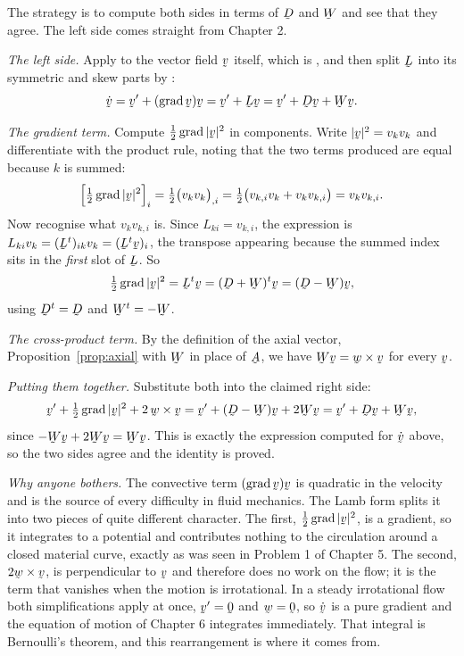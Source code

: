 \begin{solution}
The strategy is to compute both sides in terms of $\bD$ and $\bW$ and see
that they agree. The left side comes straight from Chapter 2.

\emph{The left side.} Apply  to the vector field $\bv$ itself,
which is , and then split $\bL$ into its symmetric and skew
parts by :
\[
   \dot\bv=\bv'+(\grad\bv)\bv=\bv'+\bL\bv=\bv'+\bD\bv+\bW\bv .
\]

\emph{The gradient term.} Compute $\tfrac12\grad|\bv|^{2}$ in components.
Write $|\bv|^{2}=v_{k}v_{k}$ and differentiate with the product rule,
noting that the two terms produced are equal because $k$ is summed:
\[
   \Big[\tfrac12\grad|\bv|^{2}\Big]_{i}
   =\tfrac12\big(v_{k}v_{k}\big)_{,i}
   =\tfrac12\big(v_{k,i}v_{k}+v_{k}v_{k,i}\big)
   =v_{k}v_{k,i}.
\]
Now recognise what $v_{k}v_{k,i}$ is. Since $L_{ki}=v_{k,i}$, the
expression is $L_{ki}v_{k}=(\bL^{t})_{ik}v_{k}=(\bL^{t}\bv)_{i}$, the
transpose appearing because the summed index sits in the \emph{first} slot
of $\bL$. So
\[
   \tfrac12\grad|\bv|^{2}=\bL^{t}\bv=(\bD+\bW)^{t}\bv=(\bD-\bW)\bv ,
\]
using $\bD^{t}=\bD$ and $\bW^{t}=-\bW$.

\emph{The cross-product term.} By the definition of the axial vector,
Proposition~\ref{prop:axial} with $\bW$ in place of $\bA$, we have
$\bW\bv=\bw\times\bv$ for every $\bv$.

\emph{Putting them together.} Substitute both into the claimed right side:
\[
   \bv'+\tfrac12\grad|\bv|^{2}+2\,\bw\times\bv
   =\bv'+(\bD-\bW)\bv+2\bW\bv
   =\bv'+\bD\bv+\bW\bv ,
\]
since $-\bW\bv+2\bW\bv=\bW\bv$. This is exactly the expression computed
for $\dot\bv$ above, so the two sides agree and the identity is proved.

\emph{Why anyone bothers.} The convective term $(\grad\bv)\bv$ is
quadratic in the velocity and is the source of every difficulty in fluid
mechanics. The Lamb form splits it into two pieces of quite different
character. The first, $\tfrac12\grad|\bv|^{2}$, is a gradient, so it
integrates to a potential and contributes nothing to the circulation
around a closed material curve, exactly as was seen in Problem 1 of
Chapter 5. The second, $2\bw\times\bv$, is perpendicular to $\bv$ and
therefore does no work on the flow; it is the term that vanishes when the
motion is irrotational. In a steady irrotational flow both simplifications
apply at once, $\bv'=\bze$ and $\bw=\bze$, so $\dot\bv$ is a pure gradient
and the equation of motion of Chapter 6 integrates immediately. That
integral is Bernoulli's theorem, and this rearrangement is where it comes
from.
\end{solution}

